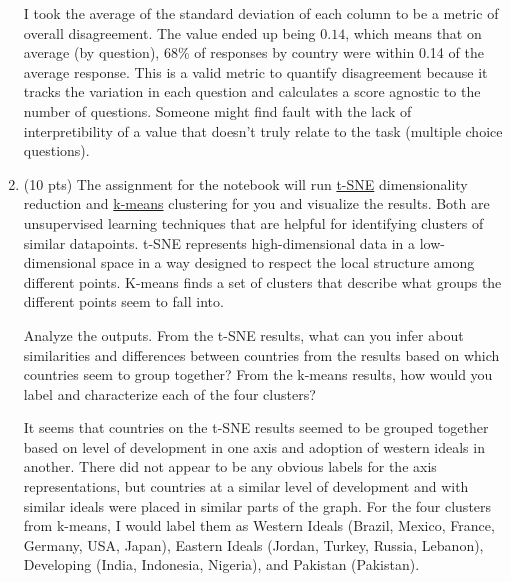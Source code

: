 \documentclass{article}
\begin{document}
\begin{enumerate}[label=(\alph*)]
    \bigskip

    \begin{mdframed}
        I took the average of the standard deviation of each column to be a metric of overall disagreement. 
        The value ended up being $0.14$, which means that on average (by question), 68\% of responses by country were within 0.14 of the average response. This is a valid metric to 
        quantify disagreement because it tracks the variation in each question and calculates a score agnostic to the number of questions. 
        Someone might find fault with the lack of interpretibility of a value that doesn't truly relate to the task (multiple choice questions).
    \end{mdframed}
    
    \item (10 pts) The assignment for the notebook will run \href{https://en.wikipedia.org/wiki/T-distributed_stochastic_neighbor_embedding}{t-SNE} dimensionality reduction and \href{https://en.wikipedia.org/wiki/K-means_clustering}{k-means} clustering for you and visualize the results. Both are unsupervised learning techniques that are helpful for identifying clusters of similar datapoints. t-SNE represents high-dimensional data in a low-dimensional space in a way designed to respect the local structure among different points. K-means finds a set of clusters that describe what groups the different points seem to fall into. 

    Analyze the outputs. From the t-SNE results, what can you infer about similarities and differences between countries from the results based on which countries seem to group together? From the k-means results, how would you label and characterize each of the four clusters? 

    \bigskip

    \begin{mdframed}
        
            It seems that countries on the t-SNE results seemed to be grouped together based on level of development in one axis and adoption of western ideals in another. There did not appear to be 
            any obvious labels for the axis representations, but countries at a similar level of development and with similar ideals 
            were placed in similar parts of the graph. For the four clusters from k-means, I would label them as Western Ideals (Brazil, Mexico, France, Germany, USA, Japan), Eastern Ideals (Jordan, Turkey, Russia, Lebanon), 
            Developing (India, Indonesia, Nigeria), and Pakistan (Pakistan).


\end{mdframed}
\end{enumerate}
\end{document}
